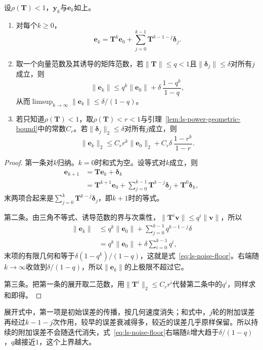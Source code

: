 \begin{theorem}[逐步误差的累积]
\label{thm:ls-accumulated-step-errors}
设$\rho(\bm T)<1$，$\bm y_k$与$\bm e_k$如上。
\begin{enumerate}
 \item 对每个$k\geq0$，
 \[
  \bm e_k=\bm T^k\bm e_0+\sum_{j=0}^{k-1}\bm T^{k-1-j}\bm\delta_j .
 \]
 \item 取一个向量范数及其诱导的矩阵范数，若$\lVert\bm T\rVert\leq q<1$且$\lVert\bm\delta_j\rVert\leq\delta$对所有$j$成立，则
 \begin{equation}
  \lVert\bm e_k\rVert\leq q^k\lVert\bm e_0\rVert+\delta\,\frac{1-q^k}{1-q},
  \label{eq:ls-noise-floor}
 \end{equation}
 从而$\limsup_{k\to\infty}\lVert\bm e_k\rVert\leq\delta/(1-q)$。
 \item 若只知道$\rho(\bm T)<1$，取$\rho(\bm T)<r<1$与引理~\ref{lem:ls-power-geometric-bound}中的常数$C_r$。若$\lVert\bm\delta_j\rVert_2\leq\delta$对所有$j$成立，则
 \[
  \lVert\bm e_k\rVert_2\leq C_rr^k\lVert\bm e_0\rVert_2+C_r\delta\,\frac{1-r^k}{1-r}.
 \]
\end{enumerate}
\end{theorem}
\begin{proof}
第一条对$k$归纳。$k=0$时和式为空。设等式对$k$成立，则
\[
\begin{aligned}
 \bm e_{k+1}&=\bm T\bm e_k+\bm\delta_k\\
 &=\bm T^{k+1}\bm e_0+\sum_{j=0}^{k-1}\bm T^{k-j}\bm\delta_j+\bm T^0\bm\delta_k ,
\end{aligned}
\]
末两项合起来是$\sum_{j=0}^{k}\bm T^{k-j}\bm\delta_j$，即$k+1$时的等式。

第二条。由三角不等式、诱导范数的界与次乘性，$\lVert\bm T^i\bm v\rVert\leq q^i\lVert\bm v\rVert$，所以
\[
\begin{aligned}
 \lVert\bm e_k\rVert&\leq q^k\lVert\bm e_0\rVert+\sum_{j=0}^{k-1}q^{k-1-j}\delta\\
 &=q^k\lVert\bm e_0\rVert+\delta\sum_{i=0}^{k-1}q^i ,
\end{aligned}
\]
末项的有限几何和等于$\delta(1-q^k)/(1-q)$，这就是式~\eqref{eq:ls-noise-floor}。右端随$k\to\infty$收敛到$\delta/(1-q)$，所以$\lVert\bm e_k\rVert$的上极限不超过它。

第三条。把第一条的展开取二范数，用$\lVert\bm T^i\rVert_2\leq C_rr^i$代替第二条中的$q^i$，同样求和即得。
\end{proof}
展开式中，第一项是初始误差的传播，按几何速度消失；和式中，$j$轮的附加误差再经过$k-1-j$次作用，较早的误差衰减得多，较近的误差几乎原样保留。所以持续的附加误差不会随迭代消失，式~\eqref{eq:ls-noise-floor}右端随$k$增大趋于$\delta/(1-q)$，$q$越接近$1$，这个上界越大。

